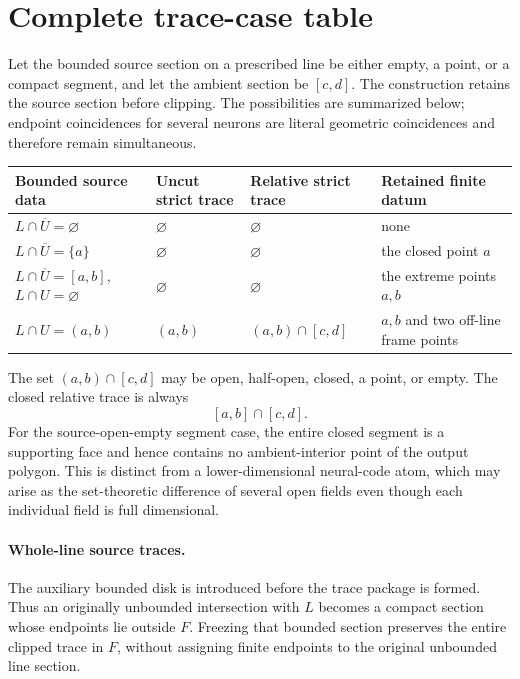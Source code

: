 \section{Complete trace-case table}\label{app:cases}

Let the bounded source section on a prescribed line be either empty, a
point, or a compact segment, and let the ambient section be $[c,d]$.  The
construction retains the source section before clipping.  The possibilities
are summarized below; endpoint coincidences for several neurons are literal
geometric coincidences and therefore remain simultaneous.

\begin{center}
\begin{tabular}{@{}p{}p{}p{}p{}@{}}
\toprule
Bounded source data & Uncut strict trace & Relative strict trace & Retained finite datum\\
\midrule
$L\cap\overline U=\varnothing$ & $\varnothing$ & $\varnothing$ & none\\[.25em]
$L\cap\overline U=\{a\}$ & $\varnothing$ & $\varnothing$ & the closed point $a$\\[.25em]
$L\cap\overline U=[a,b]$, $L\cap U=\varnothing$ & $\varnothing$ & $\varnothing$ & the extreme points $a,b$\\[.25em]
$L\cap U=(a,b)$ & $(a,b)$ & $(a,b)\cap[c,d]$ & $a,b$ and two off-line frame points\\
\bottomrule
\end{tabular}
\end{center}

The set $(a,b)\cap[c,d]$ may be open, half-open, closed, a point, or empty.
The closed relative trace is always
\[
 [a,b]\cap[c,d].
\]
For the source-open-empty segment case, the entire closed segment is a
supporting face and hence contains no ambient-interior point of the output
polygon.  This is distinct from a lower-dimensional neural-code atom, which
may arise as the set-theoretic difference of several open fields even though
each individual field is full dimensional.

\paragraph{Whole-line source traces.}
The auxiliary bounded disk is introduced before the trace package is formed.
Thus an originally unbounded intersection with $L$ becomes a compact section
whose endpoints lie outside $F$.  Freezing that bounded section preserves the
entire clipped trace in $F$, without assigning finite endpoints to the
original unbounded line section.
